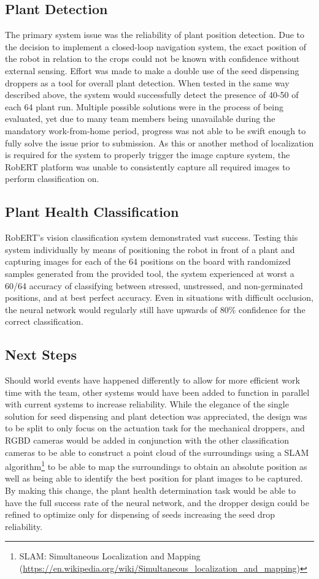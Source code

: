 \documentclass[11pt, hidelinks]{report}
\begin{document}
\subsection{Plant Detection}
The primary system issue was the reliability of plant position detection. Due to the decision to implement a closed-loop navigation system, the exact position of the robot in relation to the crops could not be known with confidence without external sensing. Effort was made to make a double use of the seed dispensing droppers as a tool for overall plant detection. When tested in the same way described above, the system would successfully detect the presence of 40-50 of each 64 plant run. Multiple possible solutions were in the process of being evaluated, yet due to many team members being unavailable during the mandatory work-from-home period, progress was not able to be swift enough to fully solve the issue prior to submission. As this or another method of localization is required for the system to properly trigger the image capture system, the RobERT platform was unable to consistently capture all required images to perform classification on.

\subsection{Plant Health Classification}
RobERT's vision classification system demonstrated vast success. Testing this system individually by means of positioning the robot in front of a plant and capturing images for each of the 64 positions on the board with randomized samples generated from the provided tool, the system experienced at worst a 60/64 accuracy of classifying between stressed, unstressed, and non-germinated positions, and at best perfect accuracy. Even in situations with difficult occlusion, the neural network would regularly still have upwards of 80\% confidence for the correct classification.

\subsection{Next Steps}
Should world events have happened differently to allow for more efficient work time with the team, other systems would have been added to function in parallel with current systems to increase reliability. While the elegance of the single solution for seed dispensing and plant detection was appreciated, the design was to be split to only focus on the actuation task for the mechanical droppers, and RGBD cameras would be added in conjunction with the other classification cameras to be able to construct a point cloud of the surroundings using a SLAM algorithm\footnote{SLAM: Simultaneous Localization and Mapping (\url{https://en.wikipedia.org/wiki/Simultaneous_localization_and_mapping})} to be able to map the surroundings to obtain an absolute position as well as being able to identify the best position for plant images to be captured. By making this change, the plant health determination task would be able to have the full success rate of the neural network, and the dropper design could be refined to optimize only for dispensing of seeds increasing the seed drop reliability.
\end{document}
